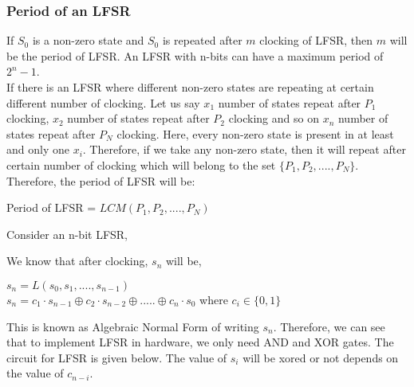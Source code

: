 \documentclass[11pt]{article}
\begin{document}
\subsubsection{Period of an LFSR} 
If $S_0$ is a non-zero state and $S_0$ is repeated after $m$ clocking of LFSR, then $m$ will be the period of LFSR. An LFSR with n-bits can have a maximum period of $2^n - 1$.\\


If there is an LFSR where different non-zero states are repeating at certain different number of clocking. Let us say $x_1$ number of states repeat after $P_1$ clocking, $x_2$ number of states repeat after $P_2$ clocking and so on $x_n$ number of states repeat after $P_N$ clocking. Here, every non-zero state is present in at least and only one $x_i$. Therefore, if we take any non-zero state, then it will repeat after certain number of clocking which will belong to the set $\{P_1, P_2,...., P_N\}$. Therefore, the period of LFSR will be:
\begin{center}
    Period of LFSR = $LCM(P_1, P_2,...., P_N)$
\end{center}

Consider an n-bit LFSR,
\begin{center}
\end{center}
We know that after clocking, $s_n$ will be,
\begin{center}
    $s_n = L(s_0,s_1,...., s_{n-1})$\\
    $s_n = c_1\cdot s_{n-1} \oplus c_2 \cdot s_{n-2} \oplus ..... \oplus c_n \cdot s_0$ where $c_i \in \{0, 1\}$
\end{center}
This is known as Algebraic Normal Form of writing $s_n$. Therefore, we can see that to implement LFSR in hardware, we only need AND and XOR gates. The circuit for LFSR is given below. The value of $s_i$ will be xored or not depends on the value of $c_{n-i}$.
\end{document}

